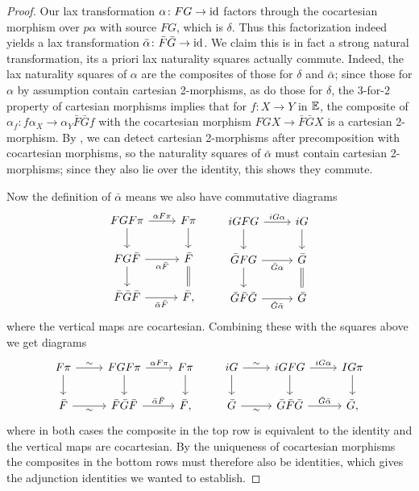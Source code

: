 \documentclass[a4paper,11pt]{article}
\begin{document}
\begin{proof}
  Our lax transformation $\alpha \colon FG \to \id$ factors through the cocartesian
  morphism over $p \alpha$ with source $FG$, which is $\delta$. Thus
  this factorization indeed yields a lax transformation $\bar{\alpha}
  \colon \bar{F}\bar{G} \to \id$. We claim this is in fact a strong
  natural transformation, \ie{} its a priori lax naturality squares
  actually commute. Indeed, the lax naturality squares of $\alpha$ are
  the composites of those for $\delta$ and $\bar{\alpha}$; since those
  for $\alpha$ by assumption contain cartesian 2-morphisms, as do
  those for $\delta$, the 3-for-2 property of cartesian morphisms
  implies that for $f \colon X \to Y$ in $\mathbb{E}$, the composite of
  $\alpha_{f} \colon f \alpha_{X} \to \alpha_{Y} \bar{F}\bar{G} f$
  with the cocartesian morphism $FGX \to \bar{F}\bar{G}X$ is a
  cartesian 2-morphism. By \cite[Lemma 2.4.2]{decorated}, we can
  detect cartesian 2-morphisms after precomposition with cocartesian
  morphisms, so the naturality squares of $\bar{\alpha}$ must contain
  cartesian 2-morphisms; since they also lie over the identity, this
  shows they commute.

  Now the definition of $\bar{\alpha}$ means we also have commutative
  diagrams
 \[
    \begin{tikzcd}
     FGF\pi \ar[r, "\alpha F \pi"] \ar[d] & F \pi  \ar[d] \\
     FG \bar{F} \ar[r, "\alpha \bar{F}"'] \ar[d] & \bar{F} \ar[d, equals] \\
     \bar{F}\bar{G}\bar{F} \ar[r, "\bar{\alpha}\bar{F}"'] & \bar{F},
    \end{tikzcd}
    \qquad
    \begin{tikzcd}
     iGFG \ar[r, "iG\alpha"] \ar[d] & iG  \ar[d] \\
     \bar{G}FG \ar[r, "\bar{G}\alpha"'] \ar[d] & \bar{G} \ar[d, equals] \\
     \bar{G}\bar{F}\bar{G} \ar[r, "\bar{G}\bar{\alpha}"'] & \bar{G}
    \end{tikzcd}
  \]
  where the vertical maps are cocartesian. Combining these with the
  squares above we get diagrams
  \[
    \begin{tikzcd}
      F\pi \ar[r, "\sim"] \ar[d] & FGF\pi  \ar[d] \ar[r, "\alpha F
      \pi"] & F \pi \ar[d] \\
     \bar{F} \ar[r, "\sim"'] & \bar{F}\bar{G}\bar{F} \ar[r, "\bar{\alpha}\bar{F}"] & \bar{F},
   \end{tikzcd}
   \qquad
       \begin{tikzcd}
      iG \ar[r, "\sim"] \ar[d] & iGFG  \ar[d] \ar[r, "i G \alpha"] & IG \pi \ar[d] \\
     \bar{G} \ar[r, "\sim"'] & \bar{G}\bar{F}\bar{G} \ar[r, "\bar{G}\bar{\alpha}"] & \bar{G},
    \end{tikzcd}
  \]
  where in both cases the composite in the top row is equivalent to
  the identity and the vertical maps are cocartesian. By the
  uniqueness of cocartesian morphisms the composites in the bottom
  rows must therefore also be identities, which gives the adjunction
  identities we wanted to establish.
\end{proof}
\end{document}
